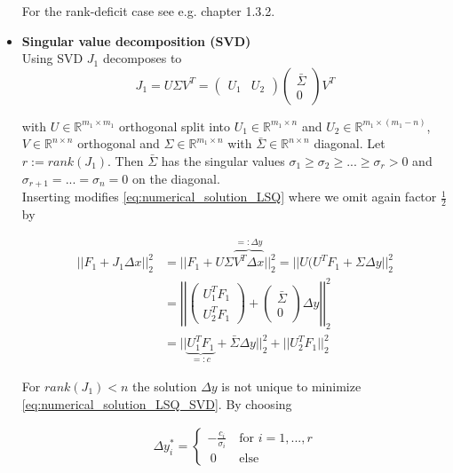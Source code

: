 \documentclass{scrartcl}[12pt, halfparskip]
\numberwithin{equation}{section}
\numberwithin{figure}{section}
\numberwithin{table}{section}
\begin{document}
\begin{itemize}
	For the rank-deficit case see e.g. \cite{numerical_methods_lsq_Bjorck} chapter 1.3.2.
		
		
		
	\item \textbf{Singular value decomposition (SVD)} \\
	Using SVD $J_1$ decomposes to
	\begin{equation}
		J_1 = U \Sigma V^T =
		\begin{pmatrix}
			U_1 & U_2
		\end{pmatrix}
		\begin{pmatrix}
			\bar{\Sigma} \\
			0
		\end{pmatrix}
			V^T
	\end{equation}
	
	with $U \in \mathbb{R}^{m_1 \times m_1}$ orthogonal split into $U_1 \in \mathbb{R}^{m_1 \times n}$ and $U_2 \in \mathbb{R}^{m_1 \times (m_1 - n)}$, $V \in \mathbb{R}^{n \times n}$ orthogonal and $\Sigma \in \mathbb{R}^{m_1 \times n}$ with $\bar{\Sigma} \in \mathbb{R}^{n \times n}$ diagonal. Let $r := rank(J_1)$. Then $\bar{\Sigma}$ has the singular values $\sigma_1 \ge \sigma_2 \ge ... \ge \sigma_r > 0$ and $\sigma_{r+1}=...=\sigma_{n} = 0$ on the diagonal. \\
	Inserting modifies \cref{eq:numerical_solution_LSQ} where we omit again factor $\frac{1}{2}$ by
	
	\begin{align}
		|| F_1 + J_1 \Delta x ||_2^2 & = || F_1 + U \Sigma \overbrace{V^T \Delta x}^{=: \Delta y} ||_2^2 = || U ( U^T F_1 + \Sigma \Delta y ||_2^2 \label{eq:numerical_solution_LSQ_SVD} \\
		& = \left| \left| \begin{pmatrix}
		U_1^T F_1 \\
		U_2^T F_1
		\end{pmatrix} + 
		\begin{pmatrix}
		\bar{\Sigma} \\
		0
		\end{pmatrix}
		\Delta y \right| \right|_2^2 \nonumber \\
		& = || \underbrace{U_1^T F_1}_{=: c} + \bar{\Sigma} \Delta y ||_2^2 + || U_2^T F_1 ||_2^2 \nonumber
	\end{align}
	
	For $rank(J_1) < n$ the solution $\Delta y$ is not unique to minimize \cref{eq:numerical_solution_LSQ_SVD}. By choosing
	
	\begin{align}
		\Delta y_i^* = 
		\begin{cases}
			- \frac{c_i}{\sigma_i} \ & \text{for } i=1,...,r \\
			\ 0 \ & \text{else}
		\end{cases}
	\end{align}
	

\end{itemize}
\end{document}
